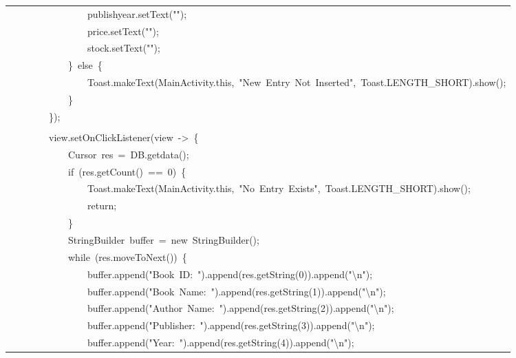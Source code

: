 \documentclass[a4paper,12pt]{article}
\begin{document}
\begin{longtable}{|p{}|}
{\ttfamily\small \ \ \ \ \ \ \ \ \ \ \ \ \ \ \ \ publishyear.setText("");} \\
{\ttfamily\small \ \ \ \ \ \ \ \ \ \ \ \ \ \ \ \ price.setText("");} \\
{\ttfamily\small \ \ \ \ \ \ \ \ \ \ \ \ \ \ \ \ stock.setText("");} \\
{\ttfamily\small \ \ \ \ \ \ \ \ \ \ \ \ \}\ else\ \{} \\
{\ttfamily\small \ \ \ \ \ \ \ \ \ \ \ \ \ \ \ \ Toast.makeText(MainActivity.this,\ "New\ Entry\ Not\ Inserted",\ Toast.LENGTH\_SHORT).show();} \\
{\ttfamily\small \ \ \ \ \ \ \ \ \ \ \ \ \}} \\
{\ttfamily\small \ \ \ \ \ \ \ \ \});} \\
\strut \\
{\ttfamily\small \ \ \ \ \ \ \ \ view.setOnClickListener(view\ -\textgreater{}\ \{} \\
{\ttfamily\small \ \ \ \ \ \ \ \ \ \ \ \ Cursor\ res\ =\ DB.getdata();} \\
{\ttfamily\small \ \ \ \ \ \ \ \ \ \ \ \ if\ (res.getCount()\ ==\ 0)\ \{} \\
{\ttfamily\small \ \ \ \ \ \ \ \ \ \ \ \ \ \ \ \ Toast.makeText(MainActivity.this,\ "No\ Entry\ Exists",\ Toast.LENGTH\_SHORT).show();} \\
{\ttfamily\small \ \ \ \ \ \ \ \ \ \ \ \ \ \ \ \ return;} \\
{\ttfamily\small \ \ \ \ \ \ \ \ \ \ \ \ \}} \\
{\ttfamily\small \ \ \ \ \ \ \ \ \ \ \ \ StringBuilder\ buffer\ =\ new\ StringBuilder();} \\
{\ttfamily\small \ \ \ \ \ \ \ \ \ \ \ \ while\ (res.moveToNext())\ \{} \\
{\ttfamily\small \ \ \ \ \ \ \ \ \ \ \ \ \ \ \ \ buffer.append("Book\ ID:\ ").append(res.getString(0)).append("\textbackslash{}n");} \\
{\ttfamily\small \ \ \ \ \ \ \ \ \ \ \ \ \ \ \ \ buffer.append("Book\ Name:\ ").append(res.getString(1)).append("\textbackslash{}n");} \\
{\ttfamily\small \ \ \ \ \ \ \ \ \ \ \ \ \ \ \ \ buffer.append("Author\ Name:\ ").append(res.getString(2)).append("\textbackslash{}n");} \\
{\ttfamily\small \ \ \ \ \ \ \ \ \ \ \ \ \ \ \ \ buffer.append("Publisher:\ ").append(res.getString(3)).append("\textbackslash{}n");} \\
{\ttfamily\small \ \ \ \ \ \ \ \ \ \ \ \ \ \ \ \ buffer.append("Year:\ ").append(res.getString(4)).append("\textbackslash{}n");} \\

\end{longtable}
\end{document}
